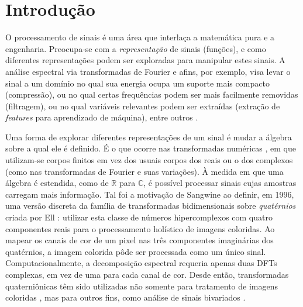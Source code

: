 \chapter{Introdu\c c\~ao}

O processamento de sinais \'e uma \'area que interla\c ca a matem\'atica pura e a engenharia. Preocupa-se com a \emph{representa\c c\~ao} de  sinais (fun\c c\~oes), e como diferentes representa\c c\~oes podem ser exploradas para manipular estes sinais. A an\'alise espectral via transformadas de Fourier e afins, por exemplo, visa levar o sinal a um dom\'inio no qual sua energia ocupa um suporte mais compacto (compress\~ao), ou no qual certas frequ\^encias podem ser mais facilmente removidas (filtragem), ou no qual vari\'aveis relevantes podem ser extra\'idas (extra\c c\~ao de \emph{features} para aprendizado de m\'aquina),
entre outros \cite{oppenheim1999discrete, rabiner2010theory, graf2015features, vergin1999generalized}.

Uma forma de explorar diferentes representa\c c\~oes de um sinal \'e mudar a \'algebra sobre a qual ele \'e definido. \'E o que ocorre nas transformadas num\'ericas \cite{blahut2010fast,pedrouzo2017number,chandra2014exact},
em que utilizam-se corpos finitos em vez dos usuais corpos dos reais ou o dos complexos (como nas transformadas de Fourier e suas varia\c c\~oes). \`A medida em que uma \'algebra \'e estendida, como de $ \mathbb{R} $ para $ \mathbb{C} $,  \'e poss\'ivel processar sinais cujas amostras carregam mais informa\c c\~ao. Tal foi a motiva\c c\~ao de Sangwine \cite{sangwine1996fourier} ao definir, em 1996, uma vers\~ao discreta da fam\'ilia de transformadas bidimensionais sobre \emph{quat\'ernios} criada por Ell \cite{ell1993quaternion}: utilizar esta classe de n\'umeros hipercomplexos com quatro componentes reais para o processamento hol\'istico de imagens coloridas. Ao mapear os canais de cor de um pixel nas tr\^es componentes imagin\'arias dos quat\'ernios, a imagem colorida p\^ode ser processada como um \'unico sinal. Computacionalmente, a decomposi\c c\~ao espectral requeria apenas duas DFTs complexas, em vez de uma para cada canal de cor. Desde ent\~ao, transformadas quaterni\^onicas t\^em sido utilizadas n\~ao somente para tratamento de imagens coloridas \cite{ell2007hypercomplex,chen2018quaternion,li2013quaternion,evans2000hypercomplex}, mas para outros fins, como an\'alise de sinais bivariados \cite{flamant2017spectral,flamant2017time,flamant2018complete}.

